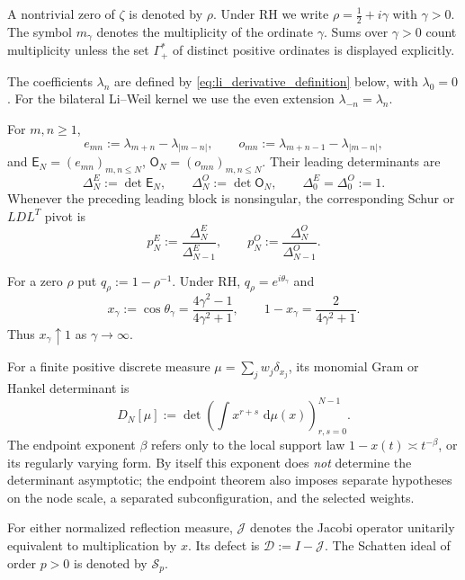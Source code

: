 \documentclass[preprint,12pt]{elsarticle}
\numberwithin{equation}{section}
\theoremstyle{plain}
\theoremstyle{definition}
\theoremstyle{remark}
\newcommand{\RH}{\mathrm{RH}}
\newcommand{\E}{\mathsf E}
\newcommand{\Omat}{\mathsf O}
\newcommand{\dd}{\,\mathrm d}
\begin{document}
\begin{description}[style=nextline,leftmargin=2.2em,itemsep=5pt]
\item[Zeros and multiplicity]
A nontrivial zero of \(\zeta\) is denoted by \(\rho\).  Under \(\RH\) we write
\(\rho=\tfrac12+i\gamma\) with \(\gamma>0\).  The symbol \(m_\gamma\) denotes the
multiplicity of the ordinate \(\gamma\).  Sums over \(\gamma>0\) count multiplicity unless
the set \(\Gamma_+^*\) of distinct positive ordinates is displayed explicitly.

\item[Li coefficients]
The coefficients \(\lambda_n\) are defined by \eqref{eq:li_derivative_definition} below,
with \(\lambda_0=0\).  For the bilateral Li--Weil kernel we use the even extension
\(\lambda_{-n}=\lambda_n\).

\item[Reflection matrices]
For \(m,n\ge1\),
\[
e_{mn}:=\lambda_{m+n}-\lambda_{|m-n|},
\qquad
o_{mn}:=\lambda_{m+n-1}-\lambda_{|m-n|},
\]
and \(\E_N=(e_{mn})_{m,n\le N}\), \(\Omat_N=(o_{mn})_{m,n\le N}\).
Their leading determinants are
\[
\Delta_N^E:=\det\E_N,\qquad
\Delta_N^O:=\det\Omat_N,\qquad
\Delta_0^E=\Delta_0^O:=1.
\]
Whenever the preceding leading block is nonsingular, the corresponding Schur or
\(LDL^T\) pivot is
\[
p_N^E:=\frac{\Delta_N^E}{\Delta_{N-1}^E},
\qquad
p_N^O:=\frac{\Delta_N^O}{\Delta_{N-1}^O}.
\]

\item[Li--Cayley coordinates]
For a zero \(\rho\) put \(q_\rho:=1-\rho^{-1}\).  Under \(\RH\),
\(q_\rho=e^{i\theta_\gamma}\) and
\[
x_\gamma:=\cos\theta_\gamma
=\frac{4\gamma^2-1}{4\gamma^2+1},
\qquad
1-x_\gamma=\frac{2}{4\gamma^2+1}.
\]
Thus \(x_\gamma\uparrow1\) as \(\gamma\to\infty\).

\item[Moment determinants]
For a finite positive discrete measure
\(\mu=\sum_jw_j\delta_{x_j}\), its monomial Gram or Hankel determinant is
\[
D_N[\mu]
:=\det\left(\int x^{r+s}\,\dd\mu(x)\right)_{r,s=0}^{N-1}.
\]
The endpoint exponent \(\beta\) refers only to the local support law
\(1-x(t)\asymp t^{-\beta}\), or its regularly varying form.  By itself this exponent does
\emph{not} determine the determinant asymptotic; the endpoint theorem also imposes separate
hypotheses on the node scale, a separated subconfiguration, and the selected weights.

\item[Jacobi operators]
For either normalized reflection measure, \(\mathcal J\) denotes the Jacobi operator
unitarily equivalent to multiplication by \(x\).  Its defect is
\(\mathcal D:=I-\mathcal J\).  The Schatten ideal of order \(p>0\) is denoted by
\(\mathcal S_p\).


\end{description}
\end{document}
